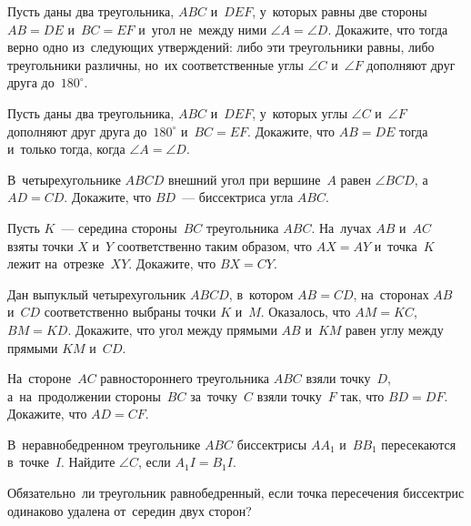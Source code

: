 


\begin{problems}

\item
Пусть даны два треугольника, $ABC$ и~$DEF$, у~которых равны две стороны
$AB = DE$ и~$BC = EF$ и~угол не~между ними $\angle A = \angle D$.
Докажите, что тогда верно одно из~следующих утверждений: либо эти треугольники
равны, либо треугольники различны, но~их соответственные углы $\angle C$
и~$\angle F$ дополняют друг друга до~$180^{\circ}$.

\item
Пусть даны два треугольника, $ABC$ и~$DEF$, у~которых углы $\angle C$
и~$\angle F$ дополняют друг друга до~$180^\circ$ и~$BC = EF$.
Докажите, что $AB = DE$ тогда и~только тогда, когда $\angle A = \angle D$.

\item
В~четырехугольнике $ABCD$ внешний угол при вершине~$A$ равен $\angle BCD$,
а~$AD = CD$.
Докажите, что $BD$~--- биссектриса угла $ABC$.

\item
Пусть $K$~--- середина стороны~$BC$ треугольника $ABC$.
На~лучах $AB$ и~$AC$ взяты точки $X$ и~$Y$ соответственно таким образом, что
$AX = AY$ и~точка~$K$ лежит на~отрезке~$XY$.
Докажите, что $BX = CY$.

\item
Дан выпуклый четырехугольник $ABCD$, в~котором $AB = CD$, на~сторонах $AB$
и~$CD$ соответственно выбраны точки $K$ и~$M$.
Оказалось, что $AM = KC$, $BM = KD$.
Докажите, что угол между прямыми $AB$ и~$KM$ равен углу между прямыми $KM$
и~$CD$.

\item
На~стороне~$AC$ равностороннего треугольника $ABC$ взяли точку~$D$,
а~на~продолжении стороны~$BC$ за~точку~$C$ взяли точку~$F$ так, что $BD = DF$.
Докажите, что $AD = CF$.

\item
В~неравнобедренном треугольнике $ABC$ биссектрисы $AA_{1}$ и~$BB_{1}$
пересекаются в~точке~$I$.
Найдите $\angle C$, если $A_{1}I = B_{1}I$.

\item
Обязательно~ли треугольник равнобедренный, если точка пересечения биссектрис
одинаково удалена от~середин двух сторон?

\end{problems}

